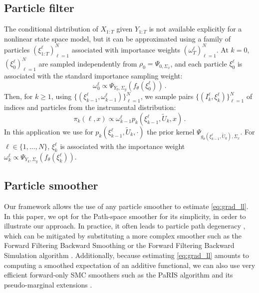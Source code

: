 \documentclass[journal]{IEEEtran}
\begin{document}
\subsection{Particle filter}
The conditional distribution of $X_{1:T}$ given $Y_{1:T}$ is not available explicitly for a nonlinear state space model, but it can be approximated using a family of particles $(\xi^{\ell}_{1:T})_{\ell=1}^N$ associated with importance weights $(\omega^{\ell}_T)_{\ell=1}^N$.
At $k = 0$, $(\xi^{\ell}_0)_{\ell=1}^N$ are sampled independently from $\rho_0 = \Psi_{0, \Sigma_x}$, and each particle $\xi^{\ell}_0$ is associated with the standard importance sampling weight:
\[
	\omega_0^{\ell} \propto  \Psi_{Y_0, \Sigma_y}(f_\theta(\xi^{\ell}_0)) \,.
\]
Then, for $k\geq 1$, using $\{(\xi^{\ell}_{k-1},\omega^{\ell}_{k-1})\}_{\ell=1}^N$, we sample pairs $\{(I^{\ell}_k,\xi^{\ell}_{k})\}_{\ell=1}^N$ of indices and particles from the instrumental distribution:
\[
	\pi_{k}(\ell,x) \propto \omega_{k-1}^{\ell} p_k(\xi^{\ell}_{k-1},\widetilde U_k,x)\,.
\]
In this application we use for $p_k(\xi^{\ell}_{k-1},\widetilde U_k,\cdot)$ the prior kernel $\Psi_{g_\theta(\xi^\ell_{k-1}, \tilde U_k), \Sigma_x}$.
For $\ell \in \{1,\ldots,N\}$, $\xi^{\ell}_k$ is associated with the importance weight $\omega^{\ell}_k \propto \Psi_{Y_k, \Sigma_y}(f_\theta(\xi^{\ell}_k))$.%

\subsection{Particle smoother}
Our framework allows the use of any particle smoother to estimate \eqref{eq:grad_ll}.
In this paper, we opt for the Path-space smoother \cite{Kitagawa1996} for its simplicity, in order to illustrate our approach.
In practice, it often leads to particle path degeneracy \cite{Andrieu2005}, which can be mitigated by substituting a more complex smoother such as the Forward Filtering Backward Smoothing \cite{Doucet2000OnSM} or the Forward Filtering Backward Simulation algorithm \cite{Godsill2004MonteCS}.
Additionally, because estimating \eqref{eq:grad_ll} amounts to computing a smoothed expectation of an additive functional, we can also use very efficient forward-only SMC smoothers such as the PaRIS algorithm and its pseudo-marginal extensions \cite{Olsson2014EfficientPO,gloaguen2022pseudo}.
\end{document}
